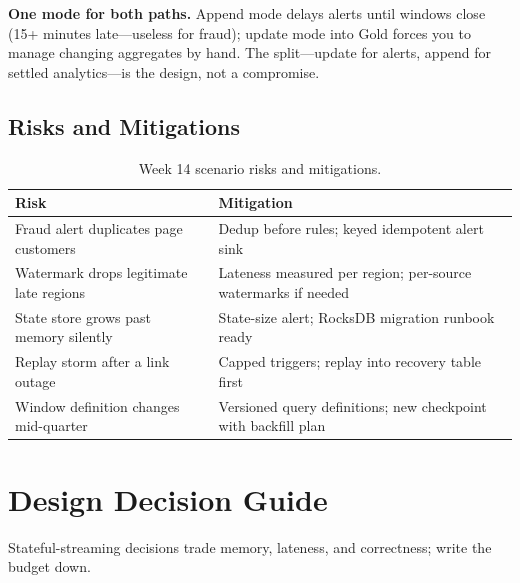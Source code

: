\begin{pitfall}
\textbf{One mode for both paths.} Append mode delays alerts until windows close (15+ minutes late---useless for fraud); update mode into Gold forces you to manage changing aggregates by hand. The split---update for alerts, append for settled analytics---is the design, not a compromise.
\end{pitfall}

\subsection{Risks and Mitigations}
\begin{table}[H]
\centering
\small
\begin{tabular}{@{}p{4.6cm}p{7.6cm}@{}}
\toprule
\textbf{Risk} & \textbf{Mitigation} \\
\midrule
Fraud alert duplicates page customers & Dedup before rules; keyed idempotent alert sink \\
Watermark drops legitimate late regions & Lateness measured per region; per-source watermarks if needed \\
State store grows past memory silently & State-size alert; RocksDB migration runbook ready \\
Replay storm after a link outage & Capped triggers; replay into recovery table first \\
Window definition changes mid-quarter & Versioned query definitions; new checkpoint with backfill plan \\
\bottomrule
\end{tabular}
\caption{Week 14 scenario risks and mitigations.}
\label{tab:ch14-risks}
\end{table}

\section{Design Decision Guide}
%
Stateful-streaming decisions trade memory, lateness, and correctness; write the budget down.

